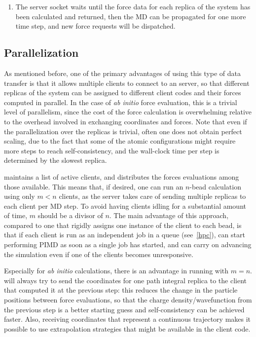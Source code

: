 \documentclass[11pt,english,fleqn]{report}
\begin{document}
\begin{enumerate}
\begin{description}
\end{description}
\item The server socket waits until the force data for each replica of the
system has been calculated and returned, then the MD can be propagated for
one more time step, and new force requests will be dispatched.
\end{enumerate}

\subsection{Parallelization}

As mentioned before, one of the primary advantages of using this type
of data transfer is that it allows multiple clients to connect
to an \ipi server, so that different replicas of the system can be
assigned to different client codes and their forces computed in parallel.
In the case of \emph{ab initio} force evaluation, this is a trivial
level of parallelism, since the cost of the force calculation
is overwhelming relative to the overhead involved in exchanging
coordinates and forces. Note that even if the parallelization over
the replicas is trivial, often one does not obtain perfect scaling,
due to the fact that some of the atomic configurations might require
more steps to reach self-consistency, and the wall-clock time per step
is determined by the slowest replica.

\ipi maintains a list of active clients, and distributes the forces
evaluations among those available. This means that, if desired, one
can run an $n$-bead calculation using only $m<n$ clients, as the
server takes care of sending multiple replicas to each client per
MD step. To avoid having clients idling for a substantial amount
of time, $m$ should be a divisor of $n$. The main advantage of
this approach, compared to one that rigidly assigns one instance of
the client to each bead, is that if each client is run as an independent
job in a queue (see~\ref{hpc}), \ipi can start performing PIMD
as soon as a single job has started, and can carry on advancing the
simulation even if one of the clients becomes unresponsive.

Especially for \emph{ab initio} calculations, there is an advantage
in running with $m=n$. \ipi will always try to send the coordinates for one
path integral replica to the client that computed it at the previous
step: this reduces the change in the particle positions between
force evaluations, so that the charge density/wavefunction from the
previous step is a better starting guess and self-consistency can be
achieved faster. Also, receiving coordinates that represent a continuous
trajectory makes it possible to use extrapolation
strategies that might be available in the client code.
\end{document}
